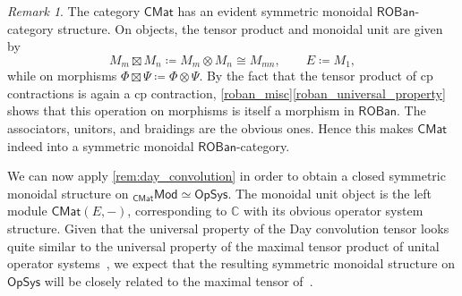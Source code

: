 \documentclass[11pt,onecolumn]{article}
\newcommand{\C}{\mathbb{C}}
\newcommand{\ROBan}{\mathsf{ROBan}}
\newcommand{\Mod}{\mathsf{Mod}}
\newcommand{\OpSys}{\mathsf{OpSys}}
\theoremstyle{plain}
\theoremstyle{remark}
\newtheorem{remark}[remark]{Remark}
\theoremstyle{definition}
\begin{document}
\begin{remark}
	\label{rem:os_tensor_closed}
	The category $\mathsf{CMat}$ has an evident symmetric monoidal $\ROBan$-category structure.
	On objects, the tensor product and monoidal unit are given by
	\[
		M_m\boxtimes M_n
		\coloneqq
		M_m\otimes M_n
		\cong
		M_{mn},
		\qquad
		E\coloneqq M_1,
	\]
	while on morphisms $\Phi\boxtimes\Psi\coloneqq\Phi\otimes\Psi$.
	By the fact that the tensor product of cp contractions is again a cp contraction,
	\cref{roban_misc}\ref{roban_universal_property} shows that this operation on morphisms is itself a morphism in $\ROBan$.
	The associators, unitors, and braidings are the obvious ones.
	Hence this makes $\mathsf{CMat}$ indeed into a symmetric monoidal $\ROBan$-category.

	We can now apply \cref{rem:day_convolution} in order to obtain a closed symmetric monoidal structure on ${}_{\mathsf{CMat}}\Mod \simeq \OpSys$.
	The monoidal unit object is the left module $\mathsf{CMat}(E,-)$, corresponding to $\C$ with its obvious operator system structure.
	Given that the universal property of the Day convolution tensor looks quite similar to the universal property of the maximal tensor product of unital operator systems~\cite[Thm.~5.8]{KavrukPaulsenTodorovTomfordeTensor},
	we expect that the resulting symmetric monoidal structure on $\OpSys$ will be closely related to the maximal tensor of~\cite{KavrukPaulsenTodorovTomfordeTensor}.


\end{remark}
\end{document}
